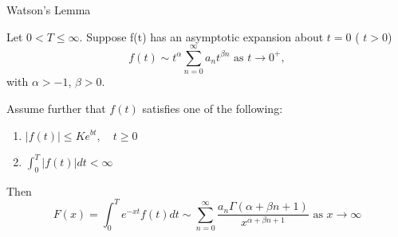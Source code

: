\documentclass[a4paper]{article}
\begin{document}
\begin{thm} Watson's Lemma

	Let $0 < T \le \infty $. Suppose f(t) has an asymptotic expansion about $t=0$ ( $t>0$)
	 \[
		 f(t) \sim t^{\alpha} \sum_{n=0}^{\infty} a_n t^{\beta n} \text{ as } t \to 0^{+}
	 ,\] with $\alpha > -1$,  $\beta > 0$.

	 Assume further that $f(t)$ satisfies one of the following:

	 \begin{enumerate}
		\item $|f(t)| \le  K e^{bt}, \quad t\ge 0$ \\
		\item $\int_{0}^{T} |f(t)| dt < \infty$	
	 \end{enumerate}
	
	 Then
	 \[
		 F(x) = \int_{0}^{T} e^{-xt}f(t) dt \sim \sum_{n=0}^{\infty} \frac{a_n \Gamma(\alpha + \beta n + 1)}{x^{\alpha + \beta n + 1}} \text{ as } x\to \infty
	 \]

\end{thm}
\end{document}

